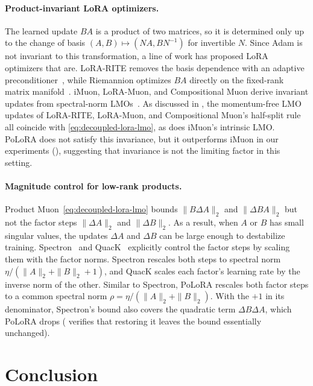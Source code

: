 \documentclass[11pt]{article}
\newcommand{\norm}[1]{\| #1\|}
\newcommand{\methodname}{PoLoRA\xspace}
\theoremstyle{plain}
\theoremstyle{definition}
\theoremstyle{remark}
\theoremstyle{definition}
\begin{document}
\paragraph{Product-invariant LoRA optimizers.}
The learned update $BA$ is a product of two matrices, so it is determined only up to the
change of basis $(A,B)\mapsto(NA,BN^{-1})$ for invertible $N$. Since Adam is not invariant
to this transformation, a line of work has proposed LoRA optimizers that are. LoRA-RITE
removes the basis dependence with an adaptive preconditioner~\cite{lorarite}, while Riemannion
optimizes $BA$ directly on the fixed-rank matrix manifold~\cite{riemannion}. iMuon, LoRA-Muon, and Compositional Muon derive invariant updates from
spectral-norm LMOs~\cite{imuon,loramuon,tilde_csd}. As discussed in , the momentum-free LMO updates of LoRA-RITE, LoRA-Muon,
and Compositional Muon's half-split rule all coincide with \eqref{eq:decoupled-lora-lmo}, as does iMuon's intrinsic LMO. \methodname{} does not satisfy this invariance, but it outperforms iMuon in our experiments (), suggesting that invariance is not the limiting factor in this setting.

\paragraph{Magnitude control for low-rank products.}
Product Muon~\eqref{eq:decoupled-lora-lmo} bounds $\norm{B\Delta A}_2$ and $\norm{\Delta B A}_2$ but not the factor steps $\norm{\Delta A}_2$ and $\norm{\Delta B}_2$. As a result, when $A$ or $B$ has small singular values, the updates $\Delta A$ and $\Delta B$ can be large enough to destabilize training. Spectron~\cite{spectron} and QuacK~\cite{quack} explicitly control the factor steps by scaling them with the factor norms. Spectron rescales both steps to spectral norm $\eta/(\norm{A}_2+\norm{B}_2+1)$, and QuacK scales each factor's learning rate by the inverse norm of the other. Similar to Spectron, \methodname{} rescales both factor steps to a common spectral norm $\rho=\eta/(\norm{A}_2+\norm{B}_2)$. With the $+1$ in its denominator, Spectron's bound also covers the quadratic term $\Delta B \Delta A$, which \methodname{} drops ( verifies that restoring it leaves the bound essentially unchanged).


\section{Conclusion}
\label{sec:conclusion}
\end{document}
